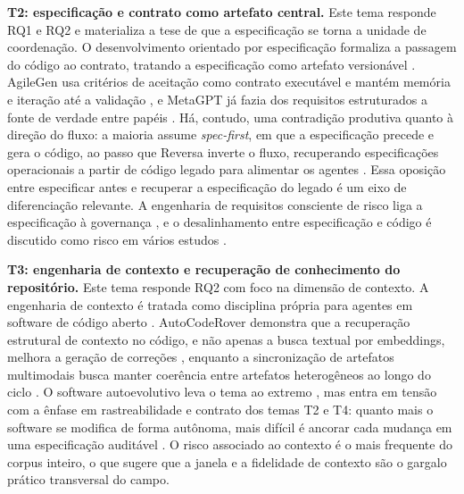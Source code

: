 \noindent\textbf{T2: especificação e contrato como artefato central.} Este tema responde RQ1 e RQ2 e materializa a tese de que a especificação se torna a unidade de coordenação. O desenvolvimento orientado por especificação formaliza a passagem do código ao contrato, tratando a especificação como artefato versionável \cite{DeepakBabuPiskala2026}. AgileGen usa critérios de aceitação como contrato executável e mantém memória e iteração até a validação \cite{SaiZhang2025}, e MetaGPT já fazia dos requisitos estruturados a fonte de verdade entre papéis \cite{SiruiHong2023}. Há, contudo, uma contradição produtiva quanto à direção do fluxo: a maioria assume \textit{spec-first}, em que a especificação precede e gera o código, ao passo que Reversa inverte o fluxo, recuperando especificações operacionais a partir de código legado para alimentar os agentes \cite{Macedo2026}. Essa oposição entre especificar antes e recuperar a especificação do legado é um eixo de diferenciação relevante. A engenharia de requisitos consciente de risco liga a especificação à governança \cite{Watfa2026}, e o desalinhamento entre especificação e código é discutido como risco em vários estudos \cite{DeepakBabuPiskala2026,Paduraru2026,Watfa2026,YuCheng2023,Gupta2022,MitulModi2024,Khan2026,Gadamsetty2025}.

\noindent\textbf{T3: engenharia de contexto e recuperação de conhecimento do repositório.} Este tema responde RQ2 com foco na dimensão de contexto. A engenharia de contexto é tratada como disciplina própria para agentes em software de código aberto \cite{SeyedmoeinMohsenimofidi2025}. AutoCodeRover demonstra que a recuperação estrutural de contexto no código, e não apenas a busca textual por embeddings, melhora a geração de correções \cite{YuntongZhang2024}, enquanto a sincronização de artefatos multimodais busca manter coerência entre artefatos heterogêneos ao longo do ciclo \cite{Paiva2026}. O software autoevolutivo leva o tema ao extremo \cite{LiyiCai2025}, mas entra em tensão com a ênfase em rastreabilidade e contrato dos temas T2 e T4: quanto mais o software se modifica de forma autônoma, mais difícil é ancorar cada mudança em uma especificação auditável \cite{Macedo2026,AhmedEHassan2024,Chechik2026}. O risco associado ao contexto é o mais frequente do corpus inteiro, o que sugere que a janela e a fidelidade de contexto são o gargalo prático transversal do campo.

